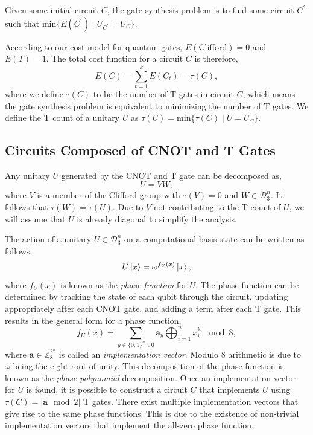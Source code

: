 \documentclass{article}
\theoremstyle{definition}
\theoremstyle{problem}
\theoremstyle{lemma}
\begin{document}
	Given some initial circuit $C$, the gate synthesis problem is to find some circuit $C^\prime$ such that $\text{min}\{E(C^\prime) \mid U_{C^\prime} = U_C\}$.
	
	According to our cost model for quantum gates, $E(\text{Clifford}) = 0$ and $E(T)=1$. The total cost function for a circuit $C$ is therefore,
	\begin{equation}
	E(C) = \sum_{t=1}^k E(C_t) = \tau(C),
	\end{equation}
	where we define $\tau(C)$ to be the number of T gates in circuit $C$, which means the gate synthesis problem is equivalent to minimizing the number of T gates. We define the T count of a unitary $U$ as $\tau(U) = \text{min}\{\tau(C) \mid U = U_C\}$.
	
	\label{s3_Problem}
		\subsection{Circuits Composed of CNOT and T Gates}
	Any unitary $U$ generated by the CNOT and T gate can be decomposed as,
	\begin{equation}
	U = VW,
	\end{equation}
	where $V$ is a member of the Clifford group with $\tau(V)=0$ and $W \in \mathcal{D}_3^n$. It follows that $\tau(W) = \tau(U)$. Due to $V$ not contributing to the T count of $U$, we will assume that $U$ is already diagonal to simplify the analysis.
	
	The action of a unitary $U \in \mathcal{D}_3^n$ on a computational basis state can be written as follows,
	\begin{equation}
	U\left\vert{x}\right\rangle = \omega^{f_U(x)}\left\vert{x}\right\rangle,
	\end{equation}
	where $f_U(x)$ is known as the \emph{phase function} for $U$. The phase function can be determined by tracking the state of each qubit through the circuit, updating appropriately after each CNOT gate, and adding a term after each T gate. This results in the general form for a phase function,
	\begin{equation}
	f_U(x) = \sum_{y\in\{0,1\}^n\backslash 0} \mathbf{a}_y \bigoplus_{i=1}^n x_i^{y_i}\mod 8,
	\end{equation}
	where $\mathbf{a}\in \mathbb{Z}_8^{2^n}$ is called an \emph{implementation vector}. Modulo 8 arithmetic is due to $\omega$ being the eight root of unity. This decomposition of the phase function is known as the \emph{phase polynomial} decomposition. Once an implementation vector for $U$ is found, it is possible to construct a circuit $C$ that implements $U$ using $\tau(C) = |\mathbf{a} \mod 2|$ T gates. There exist multiple implementation vectors that give rise to the same phase functions. This is due to the existence of non-trivial implementation vectors that implement the all-zero phase function.
	
\end{document}
